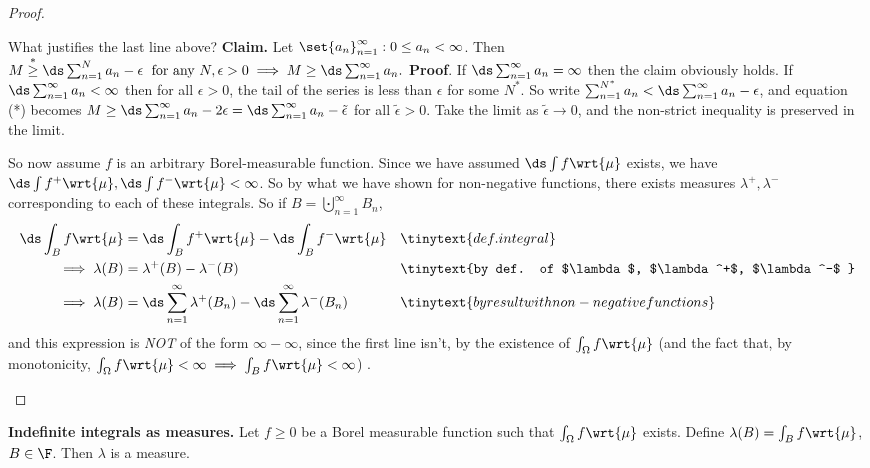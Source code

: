 \documentclass{article} %
\begin{document}
\begin{proof}
\begin{itemize}
{\tiny What justifies the last line above?  \textbf{Claim.} Let $\set{a_n}_{n=1}^\infty : 0 \leq a_n < \infty$.  Then $M \stackrel{*}{\geq} \ds\sum_{n=1}^N a_n - \epsilon \; \text{ for any } N, \epsilon>0 \implies M \geq \ds\sum_{n=1}^\infty a_n.$ \textbf{Proof}. If $\ds\sum_{n=1}^\infty a_n = \infty$ then the claim obviously holds.  If $\ds\sum_{n=1}^\infty a_n < \infty$ then for all $\epsilon >0$, the tail of the series is less than $\epsilon$ for some $N^*$.  So write $\sum_{n=1}^{N^*} a_n < \ds\sum_{n=1}^\infty a_n - \epsilon$, and equation (*) becomes $M \geq \ds\sum_{n=1}^\infty a_n - 2\epsilon = \ds\sum_{n=1}^\infty a_n -\tilde{\epsilon}$ for all $\tilde{\epsilon} > 0$.  Take the limit as $\tilde{\epsilon} \to 0$, and the non-strict inequality is preserved in the limit.}

So now assume $f$ is an arbitrary Borel-measurable function.  Since we have assumed $\ds\int f \wrt{\mu}$ exists, we have $\ds\int f^+ \wrt{\mu}, \ds\int f^- \wrt{\mu} < \infty$.  So by what we have shown for non-negative functions, there exists measures $\lambda^+, \lambda^-$ corresponding to each of these integrals.  So if $B = \bigcupdot_{n=1}^\infty B_n$, 
\begin{align*}
\ds\int_B f \wrt{\mu} &= \ds\int_B f^+ \wrt{\mu} - \ds\int_B f^- \wrt{\mu} && \tinytext{def. integral} \\
\implies \lambda(B) &= \lambda^+(B) - \lambda^-(B) && \tinytext{by def. of $\lambda$, $\lambda^+$, $\lambda^-$ } \\
\implies \lambda(B) &= \ds\sum_{n=1}^\infty \lambda^+(B_n) - \ds\sum_{n=1}^\infty \lambda^-(B_n) && \tinytext{by result with non-negative functions } \\
\end{align*}
 and this expression is \textit{NOT} of the form $\infty - \infty$, since the first line isn't, by the existence of $\int_\Omega f \wrt{\mu}$ {\tiny (and the fact that, by monotonicity, $\int_\Omega f \wrt{\mu} < \infty \implies \int_B f \wrt{\mu} < \infty  $) }.

\end{itemize}

\end{proof}

\begin{corollary}{\textbf{Indefinite integrals as measures.}}
Let $f \geq 0$ be a Borel measurable function such that $\int_\Omega f \wrt{\mu}$ exists.  Define $\lambda(B) = \int_B f \wrt{\mu}$, $B \in \F$.  Then $\lambda$ is a measure.	
\label{cor:indefinite_integrals_as_measures}
\end{corollary}
\end{document}
